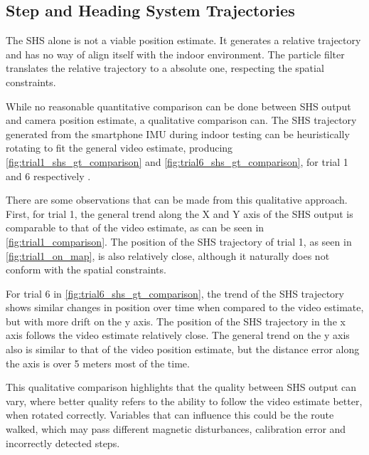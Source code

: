 \subsection{Step and Heading System Trajectories}
\label{sec:results-SHS_trajectories}
The \acl{SHS} alone is not a viable position estimate. It generates a relative trajectory and has no way of align itself with the indoor environment. The particle filter translates the relative trajectory to a absolute one, respecting the spatial constraints.\par 

While no reasonable quantitative comparison can be done between \ac{SHS} output and camera position estimate, a qualitative comparison can. The SHS trajectory generated from the smartphone IMU during indoor testing can be heuristically rotating to fit the general video estimate, producing \cref{fig:trial1_shs_gt_comparison} and \cref{fig:trial6_shs_gt_comparison}, for trial 1 and 6 respectively .\par 

There are some observations that can be made from this qualitative approach. First, for trial 1, the general trend along the X and Y axis of the SHS output is comparable to that of the video estimate, as can be seen in \cref{fig:trial1_comparison}. The position of the SHS trajectory of trial 1, as seen in \cref{fig:trial1_on_map}, is also relatively close, although it naturally does not conform with the spatial constraints. \par 
For trial 6 in \cref{fig:trial6_shs_gt_comparison}, the trend of the SHS trajectory shows similar changes in position over time when compared to the video estimate, but with more drift on the y axis. The position of the SHS trajectory in the x axis follows the video estimate relatively close. The general trend on the y axis also is similar to that of the video position estimate, but the distance error along the axis is over 5 meters most of the time. \par 

This qualitative comparison highlights that the quality between SHS output can vary, where better quality refers to the ability to follow the video estimate better, when rotated correctly. Variables that can influence this could be the route walked, which may pass different magnetic disturbances, calibration error and incorrectly detected steps.

